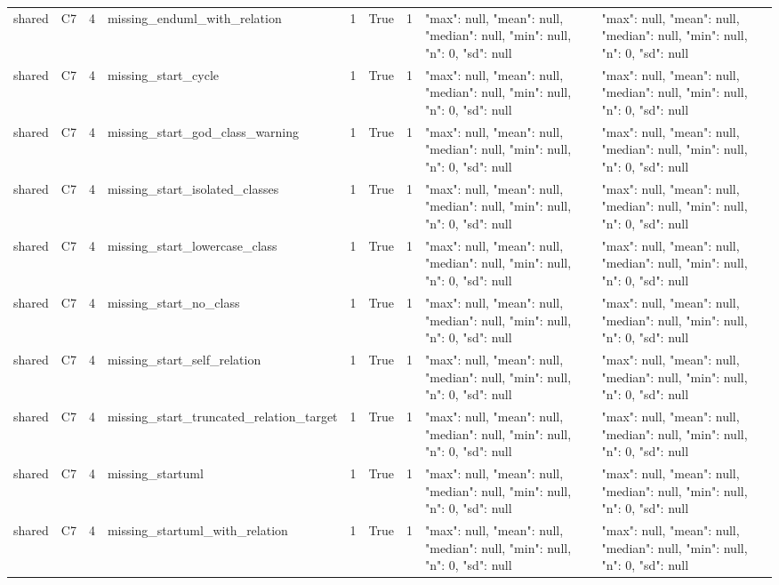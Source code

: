 \begin{tabular}{lllllllll}
shared & C7 & 4 & missing\_enduml\_with\_relation & 1 & True & 1 & {"max": null, "mean": null, "median": null, "min": null, "n": 0, "sd": null} & {"max": null, "mean": null, "median": null, "min": null, "n": 0, "sd": null} \\
shared & C7 & 4 & missing\_start\_cycle & 1 & True & 1 & {"max": null, "mean": null, "median": null, "min": null, "n": 0, "sd": null} & {"max": null, "mean": null, "median": null, "min": null, "n": 0, "sd": null} \\
shared & C7 & 4 & missing\_start\_god\_class\_warning & 1 & True & 1 & {"max": null, "mean": null, "median": null, "min": null, "n": 0, "sd": null} & {"max": null, "mean": null, "median": null, "min": null, "n": 0, "sd": null} \\
shared & C7 & 4 & missing\_start\_isolated\_classes & 1 & True & 1 & {"max": null, "mean": null, "median": null, "min": null, "n": 0, "sd": null} & {"max": null, "mean": null, "median": null, "min": null, "n": 0, "sd": null} \\
shared & C7 & 4 & missing\_start\_lowercase\_class & 1 & True & 1 & {"max": null, "mean": null, "median": null, "min": null, "n": 0, "sd": null} & {"max": null, "mean": null, "median": null, "min": null, "n": 0, "sd": null} \\
shared & C7 & 4 & missing\_start\_no\_class & 1 & True & 1 & {"max": null, "mean": null, "median": null, "min": null, "n": 0, "sd": null} & {"max": null, "mean": null, "median": null, "min": null, "n": 0, "sd": null} \\
shared & C7 & 4 & missing\_start\_self\_relation & 1 & True & 1 & {"max": null, "mean": null, "median": null, "min": null, "n": 0, "sd": null} & {"max": null, "mean": null, "median": null, "min": null, "n": 0, "sd": null} \\
shared & C7 & 4 & missing\_start\_truncated\_relation\_target & 1 & True & 1 & {"max": null, "mean": null, "median": null, "min": null, "n": 0, "sd": null} & {"max": null, "mean": null, "median": null, "min": null, "n": 0, "sd": null} \\
shared & C7 & 4 & missing\_startuml & 1 & True & 1 & {"max": null, "mean": null, "median": null, "min": null, "n": 0, "sd": null} & {"max": null, "mean": null, "median": null, "min": null, "n": 0, "sd": null} \\
shared & C7 & 4 & missing\_startuml\_with\_relation & 1 & True & 1 & {"max": null, "mean": null, "median": null, "min": null, "n": 0, "sd": null} & {"max": null, "mean": null, "median": null, "min": null, "n": 0, "sd": null} \\

\end{tabular}

